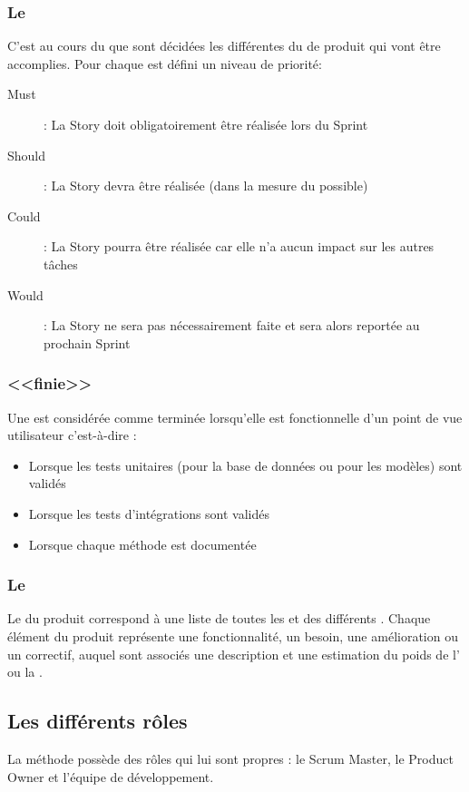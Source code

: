 \subsubsection{Le \PlanningPoker}
C'est au cours du \PlanningPoker{} que sont décidées les différentes \UserStories{} du \Backlog{} de produit qui vont être accomplies. Pour chaque \UserStory{} est défini un niveau de priorité:
\begin{description}
	\item[Must] : La Story doit obligatoirement être réalisée lors du Sprint
	\item[Should] : La Story devra être réalisée (dans la mesure du possible)
	\item[Could] : La Story pourra être réalisée car elle n’a aucun impact sur les autres tâches
	\item[Would] : La Story ne sera pas nécessairement faite et sera alors reportée au prochain Sprint
\end{description}

\subsubsection{\UserStory{} <<finie>>}
Une \UserStory{} est considérée comme terminée lorsqu’elle est fonctionnelle d’un point de vue
utilisateur c’est-à-dire :
\begin{itemize}
\item Lorsque les tests unitaires (pour la base de données ou pour les modèles) sont validés
\item Lorsque les tests d’intégrations sont validés
\item Lorsque chaque méthode est documentée 
\end{itemize}

\subsubsection{Le \Backlog}
Le \Backlog{} du produit correspond à une liste de toutes les \UserStories{} et \TechnicalStories{} des différents \Sprints. Chaque élément du \Backlog{} produit représente une fonctionnalité, un besoin, une amélioration ou un correctif, auquel sont associés une description et une estimation du poids de l'\UserStory{} ou la \TechnicalStory{}.

\subsection{Les différents rôles}
La méthode \Scrum{} possède des rôles qui lui sont propres : le Scrum Master, le Product Owner
et l’équipe de développement.

